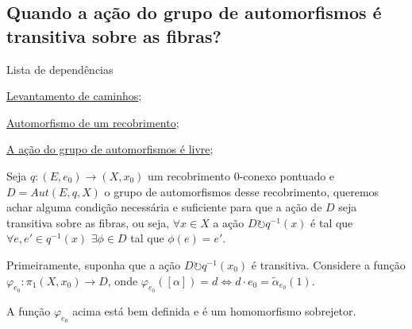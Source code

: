 \subsection{Quando a ação do grupo de automorfismos é transitiva sobre as fibras?}
\label{acao-de-automorfismo-transitiva-prop}
\begin{titlemize}{Lista de dependências}
    \item \hyperref[levantamento-de-caminhos-prop]{Levantamento de caminhos};\\
	\item \hyperref[automorfismo-de-recobrimento-def]{Automorfismo de um recobrimento};\\
    \item \hyperref[acao-de-automorfismos-e-livre-prop]{A ação do grupo de automorfismos é livre};
\end{titlemize}
Seja $q:(E, e_0) \longrightarrow (X, x_0)$ um recobrimento 0-conexo pontuado e $D=Aut(E, q, X)$ o grupo de automorfismos desse recobrimento, queremos achar alguma condição necessária e suficiente para que a ação de $D$ seja transitiva sobre as fibras, ou seja, $\forall x \in X$ a ação $D \circlearrowright q^{-1}(x)$ é tal que $\forall e, e' \in q^{-1}(x)$ $\exists \phi \in D$ tal que $\phi(e) = e'$.

Primeiramente, suponha que a ação $D \circlearrowright q^{-1}(x_0)$ é transitiva. Considere a função $\varphi_{e_0}:\pi_1(X, x_0) \longrightarrow D$, onde $\varphi_{e_0}([\alpha]) = d \Longleftrightarrow d \cdot e_0 = \tilde \alpha_{e_0}(1)$.

\begin{af}
    A função $\varphi_{e_0}$ acima está bem definida e é um homomorfismo sobrejetor.
\end{af}

